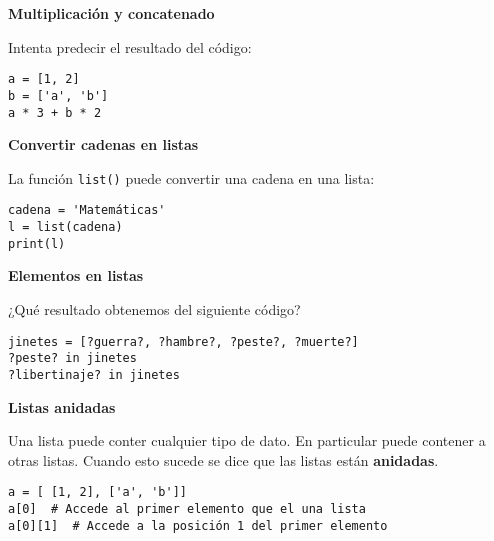 \documentclass[a4paper, 11pt]{scrartcl}
\newenvironment{code}{\begin{tcolorbox}[colback=red!2!white]}{\end{tcolorbox}}
\begin{document}
\noindent\textbf{\sffamily Multiplicación y concatenado}

Intenta predecir el resultado del código:

\smallskip

\begin{code}

\begin{verbatim}
a = [1, 2]
b = ['a', 'b']
a * 3 + b * 2
\end{verbatim}

\end{code}





\noindent\textbf{\sffamily \dag{} Convertir cadenas en listas}

La función \verb|list()| puede convertir una cadena en una lista:

\smallskip

\begin{code}

\begin{verbatim}
cadena = 'Matemáticas'
l = list(cadena)
print(l)
\end{verbatim}

\end{code}





\noindent\textbf{\sffamily Elementos en listas}

¿Qué resultado obtenemos del siguiente código?

\smallskip

\begin{code}

\begin{verbatim}
jinetes = [?guerra?, ?hambre?, ?peste?, ?muerte?]
?peste? in jinetes
?libertinaje? in jinetes
\end{verbatim}

\end{code}





\noindent\textbf{\sffamily \dag{} Listas anidadas}

Una lista puede conter cualquier tipo de dato. En particular puede contener a otras listas. Cuando esto sucede se dice que las listas están \textbf{anidadas}.

\smallskip

\begin{code}

\begin{verbatim}
a = [ [1, 2], ['a', 'b']]
a[0]  # Accede al primer elemento que el una lista
a[0][1]  # Accede a la posición 1 del primer elemento
\end{verbatim}

\end{code}
\end{document}
